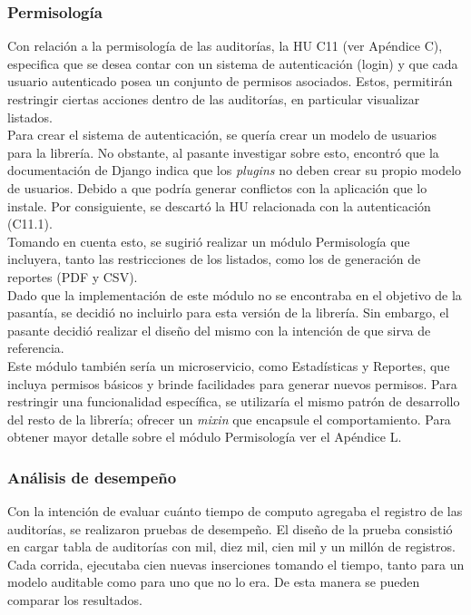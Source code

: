 \subsubsection{Permisología}

Con relación a la permisología de las auditorías, la HU C11 (ver Apéndice C), especifica que se desea contar con un sistema de autenticación (login) y que cada usuario autenticado posea un conjunto de permisos asociados. Estos, permitirán restringir ciertas acciones dentro de las auditorías, en particular visualizar listados. \\

Para crear el sistema de autenticación, se quería crear un modelo de usuarios para la librería. No obstante, al pasante investigar sobre esto, encontró que la documentación de Django indica que los \textit{plugins} no deben crear su propio modelo de usuarios. Debido a que podría generar conflictos con la aplicación que lo instale. Por consiguiente, se descartó la HU relacionada con la autenticación (C11.1). \\

Tomando en cuenta esto, se sugirió realizar un módulo Permisología que incluyera, tanto las restricciones de los listados, como los de generación de reportes (PDF y CSV).\\

Dado que la implementación de este módulo no se encontraba en el objetivo de la pasantía, se decidió no incluirlo para esta versión de la librería. Sin embargo, el pasante decidió realizar el diseño del mismo con la intención de que sirva de referencia. \\

Este módulo también sería un microservicio, como Estadísticas y Reportes, que incluya permisos básicos y brinde facilidades para generar nuevos permisos. Para restringir una funcionalidad específica, se utilizaría el mismo patrón de desarrollo del resto de la librería; ofrecer un \textit{mixin} que encapsule el comportamiento. Para obtener mayor detalle sobre el módulo Permisología ver el Apéndice L.

\subsubsection{Análisis de desempeño}

Con la intención de evaluar cuánto tiempo de computo agregaba el registro de las auditorías, se realizaron pruebas de desempeño. El diseño de la prueba consistió en cargar tabla de auditorías con mil, diez mil, cien mil y un millón de registros. Cada corrida, ejecutaba cien nuevas inserciones tomando el tiempo, tanto para un modelo auditable como para uno que no lo era. De esta manera se pueden comparar los resultados.\\

